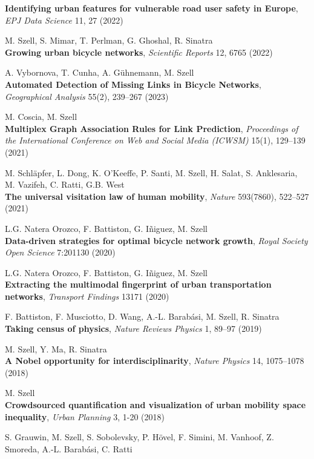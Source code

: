 \documentclass[10pt,a4paper]{article}
\renewenvironment{itemize}{
  \begin{list}{}{
    \setlength{\leftmargin}{1.5em}
    \setlength{\itemsep}{0.25em}
    \setlength{\parskip}{0pt}
    \setlength{\parsep}{0.25em}
  }
}{
  \end{list}
}
\begin{document}
\begin{itemize}
    \textbf{Identifying urban features for vulnerable road user safety in Europe}, \textit{EPJ Data Science} 11, 27 (2022)
\item M. Szell, S. Mimar, T. Perlman, G. Ghoshal, R. Sinatra\\
    \textbf{Growing urban bicycle networks}, \textit{Scientific Reports} 12, 6765 (2022)
\item A. Vybornova, T. Cunha, A. Gühnemann, M. Szell\\
    \textbf{Automated Detection of Missing Links in Bicycle Networks}, \textit{Geographical Analysis} 55(2), 239--267 (2023)
\item M. Coscia, M. Szell\\
    \textbf{Multiplex Graph Association Rules for Link Prediction}, \textit{Proceedings of the International Conference on Web and Social Media (ICWSM)} 15(1), 129--139 (2021)
\item M. Schläpfer, L. Dong, K. O'Keeffe, P. Santi, M. Szell, H. Salat, S. Anklesaria, M. Vazifeh, C. Ratti, G.B. West\\
    \textbf{The universal visitation law of human mobility}, \textit{Nature} 593(7860), 522--527 (2021)
\item L.G. Natera Orozco, F. Battiston, G. I{\~n}iguez, M. Szell\\
    \textbf{Data-driven strategies for optimal bicycle network growth}, \textit{Royal Society Open Science} 7:201130 (2020)
\item L.G. Natera Orozco, F. Battiston, G. Iñiguez, M. Szell\\
    \textbf{Extracting the multimodal fingerprint of urban transportation networks}, \textit{Transport Findings} 13171 (2020)
\item F. Battiston, F. Musciotto, D. Wang, A.-L. Barab\'asi, M. Szell, R. Sinatra\\
    \textbf{Taking census of physics}, \textit{Nature Reviews Physics} 1, 89--97 (2019)
\item M. Szell, Y. Ma, R. Sinatra\\
    \textbf{A Nobel opportunity for interdisciplinarity}, \textit{Nature Physics} 14, 1075--1078 (2018)
\item M. Szell\\
    \textbf{Crowdsourced quantification and visualization of urban mobility space inequality}, \textit{Urban Planning} 3, 1-20 (2018)
\item S. Grauwin, M. Szell, S. Sobolevsky, P. H\"{o}vel, F. Simini, M. Vanhoof, Z. Smoreda, A.-L. Barab\'asi, C. Ratti\\

\end{itemize}
\end{document}

